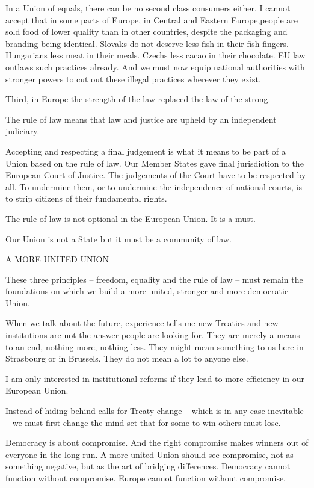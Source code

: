 \documentclass[a4paper,11pt]{article}
\begin{document}
In a Union of equals, there can be no second class consumers either. I cannot accept that in some parts of Europe, in Central and Eastern Europe,people are sold food of lower quality than in other countries, despite the packaging and branding being identical. Slovaks do not deserve less fish in their fish fingers. Hungarians less meat in their meals. Czechs less cacao in their chocolate. EU law outlaws such practices already. And we must now equip national authorities with stronger powers to cut out these illegal practices wherever they exist.

 

Third, in Europe the strength of the law replaced the law of the strong.

The rule of law means that law and justice are upheld by an independent judiciary.

Accepting and respecting a final judgement is what it means to be part of a Union based on the rule of law. Our Member States gave final jurisdiction to the European Court of Justice. The judgements of the Court have to be respected by all. To undermine them, or to undermine the independence of national courts, is to strip citizens of their fundamental rights.

The rule of law is not optional in the European Union. It is a must.

Our Union is not a State but it must be a community of law.

A MORE UNITED UNION

These three principles – freedom, equality and the rule of law – must remain the foundations on which we build a more united, stronger and more democratic Union.

When we talk about the future, experience tells me new Treaties and new institutions are not the answer people are looking for. They are merely a means to an end, nothing more, nothing less. They might mean something to us here in Strasbourg or in Brussels. They do not mean a lot to anyone else.

I am only interested in institutional reforms if they lead to more efficiency in our European Union.

Instead of hiding behind calls for Treaty change – which is in any case inevitable – we must first change the mind-set that for some to win others must lose.

Democracy is about compromise. And the right compromise makes winners out of everyone in the long run. A more united Union should see compromise, not as something negative, but as the art of bridging differences. Democracy cannot function without compromise. Europe cannot function without compromise.
\end{document}
